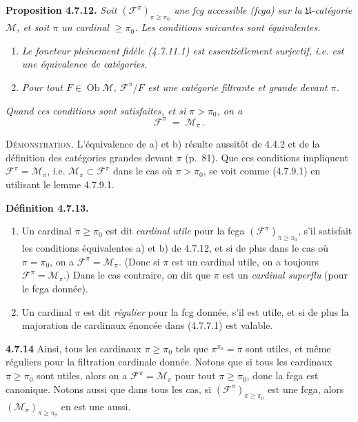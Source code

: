 \documentclass[11pt]{article}
\newcommand{\printedpage}[1]{\marginpar{\footnotesize p.~#1}}
\newcommand{\msp}[1]{\marginpar{\footnotesize [#1]}}
\newcommand{\Ob}{\operatorname{Ob}}
\begin{document}
\textbf{Proposition 4.7.12.} \textit{Soit $(\mathcal{F}^{\pi})_{\pi\geqslant\pi_0}$ une fcg accessible (fcga) sur la $\mathfrak{U}$-catégorie $\mathcal{M}$, et soit $\pi$ un cardinal $\geqslant\pi_0$. Les conditions suivantes sont équivalentes.}
\begin{enumerate}[label=\textit{\alph*)}]
\item \textit{Le foncteur pleinement fidèle (4.7.11.1) est essentiellement surjectif, i.e. est une équivalence de catégories.}
\item \textit{Pour tout $F\in\Ob\mathcal{M}$, $\mathcal{F}^{\pi}/F$ est une catégorie filtrante et grande devant $\pi$.}
\end{enumerate}

\noindent\printedpage{61}
\textit{Quand ces conditions sont satisfaites, et si $\pi>\pi_0$, on a}
\[
\mathcal{F}^{\pi} \;=\; \mathcal{M}_\pi \, . \tag*{(4.7.12.1)}
\]

\textsc{Démonstration}. L'équivalence de a) et b) résulte aussitôt de 4.4.2 et de la définition des catégories grandes devant $\pi$ (p.~81). Que ces
\msp{page 179}
conditions impliquent $\mathcal{F}^{\pi}=\mathcal{M}_\pi$, i.e. $\mathcal{M}_\pi\subset\mathcal{F}^{\pi}$ dans le cas où $\pi>\pi_0$, se voit comme (4.7.9.1) en utilisant le lemme 4.7.9.1.

\textbf{Définition 4.7.13.}
\begin{enumerate}[label={$\arabic*^{\circ}$)}]
\item Un cardinal $\pi\geqslant\pi_0$ est dit \textit{cardinal utile} pour la fcga $(\mathcal{F}^{\pi})_{\pi\geqslant\pi_0}$, s'il satisfait les conditions équivalentes a) et b) de 4.7.12, et si de plus dans le cas où $\pi=\pi_0$, on a $\mathcal{F}^{\pi}=\mathcal{M}_\pi$. (Donc si $\pi$ est un cardinal utile, on a toujours $\mathcal{F}^{\pi}=\mathcal{M}_\pi$.) Dans le cas contraire, on dit que $\pi$ est un \textit{cardinal superflu} (pour le fcga donnée). %
\item Un cardinal $\pi$ est dit \textit{régulier} pour la fcg donnée, s'il est utile, et si de plus la majoration de cardinaux énoncée dans (4.7.7.1) est valable.
\end{enumerate}

\textbf{4.7.14} Ainsi, tous les cardinaux $\pi\geqslant\pi_0$ tels que $\pi^{\pi_0}=\pi$ sont utiles, et même réguliers pour la filtration cardinale donnée. Notons que si tous les cardinaux $\pi\geqslant\pi_0$ sont utiles, alors on a $\mathcal{F}^{\pi}=\mathcal{M}_\pi$ pour tout $\pi\geqslant\pi_0$, donc la fcga est canonique. Notons aussi que dans tous les cas, si $(\mathcal{F}^{\pi})_{\pi\geqslant\pi_0}$ est une fcga, alors $(\mathcal{M}_\pi)_{\pi\geqslant\pi_0}$ en est une aussi.
\end{document}
